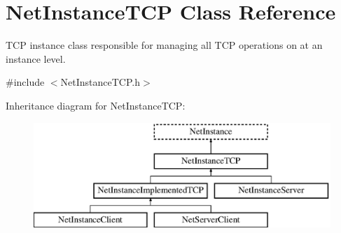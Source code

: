 \hypertarget{class_net_instance_t_c_p}{
\section{NetInstanceTCP Class Reference}
\label{class_net_instance_t_c_p}
}


TCP instance class responsible for managing all TCP operations on at an instance level.  




{\ttfamily \#include $<$NetInstanceTCP.h$>$}

Inheritance diagram for NetInstanceTCP:\begin{figure}[H]
\begin{center}
\leavevmode
\includegraphics[height=4.000000cm]{class_net_instance_t_c_p}
\end{center}
\end{figure}

